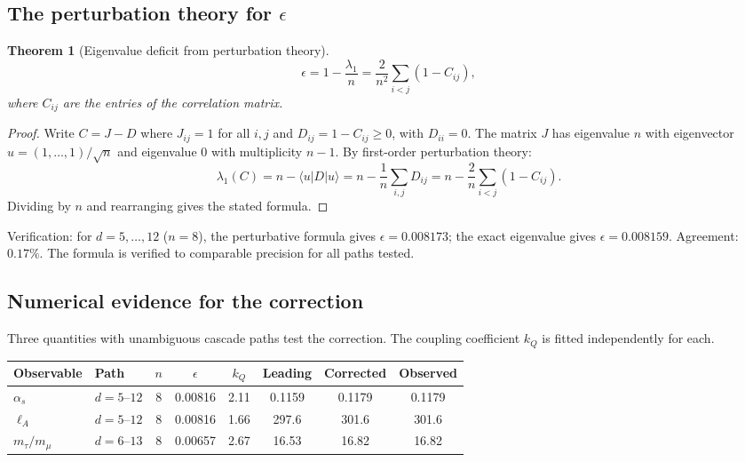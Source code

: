 \documentclass[12pt,a4paper]{article}
\newtheorem{theorem}{Theorem}[section]
\theoremstyle{remark}
\begin{document}
\subsection{The perturbation theory for $\epsilon$}\label{sec:perturbation}

\begin{theorem}[Eigenvalue deficit from perturbation theory]\label{thm:pert}
\[
\epsilon = 1 - \frac{\lambda_1}{n} = \frac{2}{n^2} \sum_{i < j} \left(1 - C_{ij}\right),
\]
where $C_{ij}$ are the entries of the correlation matrix.
\end{theorem}

\begin{proof}
Write $C = J - D$ where $J_{ij} = 1$ for all $i,j$ and $D_{ij} = 1 - C_{ij} \geq 0$, with $D_{ii} = 0$. The matrix $J$ has eigenvalue $n$ with eigenvector $u = (1, \ldots, 1)/\sqrt{n}$ and eigenvalue $0$ with multiplicity $n - 1$. By first-order perturbation theory:
\[
\lambda_1(C) = n - \langle u | D | u \rangle = n - \frac{1}{n} \sum_{i,j} D_{ij} = n - \frac{2}{n} \sum_{i < j}(1 - C_{ij}).
\]
Dividing by $n$ and rearranging gives the stated formula.
\end{proof}

\noindent Verification: for $d = 5, \ldots, 12$ ($n = 8$), the perturbative formula gives $\epsilon = 0.008173$; the exact eigenvalue gives $\epsilon = 0.008159$. Agreement: $0.17\%$. The formula is verified to comparable precision for all paths tested.

\subsection{Numerical evidence for the correction}\label{sec:verification}

Three quantities with unambiguous cascade paths test the correction. The coupling coefficient $k_Q$ is fitted independently for each.

\begin{center}
\renewcommand{\arraystretch}{1.3}
\begin{tabular}{llcccccc}
\toprule
Observable & Path & $n$ & $\epsilon$ & $k_Q$ & Leading & Corrected & Observed \\
\midrule
$\alpha_s$ & $d\!=\!5\text{--}12$ & 8 & 0.00816 & 2.11 & 0.1159 & 0.1179 & 0.1179 \\
$\ell_A$ & $d\!=\!5\text{--}12$ & 8 & 0.00816 & 1.66 & 297.6 & 301.6 & 301.6 \\
$m_\tau/m_\mu$ & $d\!=\!6\text{--}13$ & 8 & 0.00657 & 2.67 & 16.53 & 16.82 & 16.82 \\
\bottomrule
\end{tabular}
\end{center}
\end{document}
